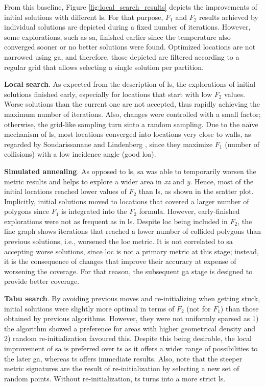 From this baseline, Figure \ref{fig:local_search_results} depicts the improvements of initial solutions with different \acrshort{ls}. For that purpose, $F_1$ and $F_2$ results achieved by individual solutions are depicted during a fixed number of iterations. However, some explorations, such as \acrshort{sa}, finished earlier since the temperature also converged sooner or no better solutions were found. Optimized locations are not narrowed using \acrshort{ga}, and therefore, those depicted are filtered according to a regular grid that allows selecting a single solution per partition.

\textbf{Local search}. As expected from the description of \acrshort{ls}, the explorations of initial solutions finished early, especially for locations that start with low $F_2$ values. Worse solutions than the current one are not accepted, thus rapidly achieving the maximum number of iterations. Also, changes were controlled with a small factor; otherwise, the grid-like sampling turn sinto a random sampling. Due to the naïve mechanism of \acrshort{ls}, most locations converged into locations very close to walls, as regarded by Soudarissanane and Lindenberg \cite{soudarissanane_optimizing_2012}, since they maximize $F_1$ (number of collisions) with a low incidence angle (good \acrshort{loa}).

\textbf{Simulated annealing}. As opposed to \acrshort{ls}, \acrshort{sa} was able to temporarily worsen the metric results and helps to explore a wider area in \textit{xz} and \textit{y}. Hence, most of the initial locations reached lower values of $F_2$ than \acrshort{ls}, as shown in the scatter plot. Implicitly, initial solutions moved to locations that covered a larger number of polygons since $F_1$ is integrated into the $F_2$ formula. However, early-finished explorations were not as frequent as in \acrshort{ls}. Despite \acrshort{loc} being included in $F_2$, the line graph shows iterations that reached a lower number of collided polygons than previous solutions, i.e., worsened the \acrshort{loc} metric. It is not correlated to \acrshort{sa} accepting worse solutions, since \acrshort{loc} is not a primary metric at this stage; instead, it is the consequence of changes that improve their accuracy at expense of worsening the coverage. For that reason, the subsequent \acrshort{ga} stage is designed to provide better coverage.

\textbf{Tabu search}. By avoiding previous moves and re-initializing when getting stuck, initial solutions were slightly more optimal in terms of $F_2$ (not for $F_1$) than those obtained by previous algorithms. However, they were not uniformly sparsed as 1) the algorithm showed a preference for areas with higher geometrical density and 2) random re-initialization favoured this. Despite this being desirable, the local improvement of \acrshort{sa} is preferred over \acrshort{ts} as it offers a wider range of possibilities to the later \acrshort{ga}, whereas \acrshort{ts} offers immediate results. Also, note that the steeper metric signatures are the result of re-initialization by selecting a new set of random points. Without re-initialization, \acrshort{ts} turns into a more strict \acrshort{ls}.

